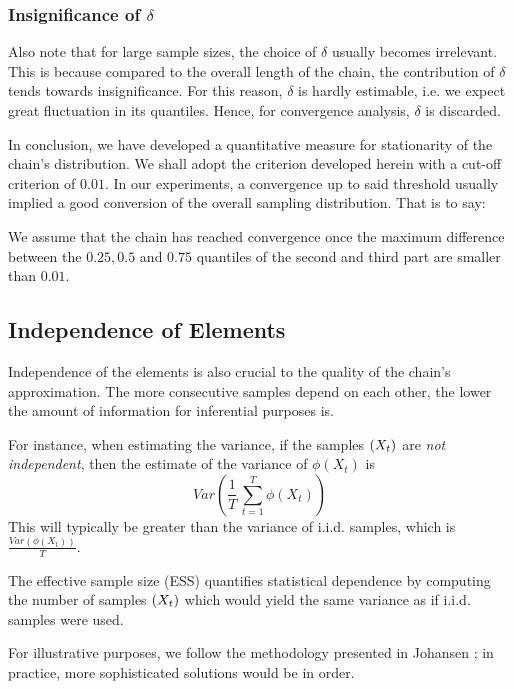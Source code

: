\subsubsection*{Insignificance of $\delta$}
Also note that for large sample sizes, the choice of $\delta$ usually becomes irrelevant. This is because compared to the overall length of the chain, the contribution of $\delta$ tends towards insignificance. For this reason, $\delta$ is hardly estimable, i.e. we expect great fluctuation in its quantiles. Hence, for convergence analysis, $\delta$ is discarded. 
\vspace{0.5cm}

In conclusion, we have developed a quantitative measure for stationarity of the chain's distribution. 
We shall adopt the criterion developed herein with a cut-off criterion of $0.01$. In our experiments, a convergence up to said threshold usually implied a good conversion of the overall sampling distribution.
 That is to say: 

\begin{center}
We assume that the chain has reached convergence once the maximum difference between the $0.25, 0.5$ and $0.75$ quantiles of the second and third part are smaller than $0.01$. 
\end{center}


\subsection{Independence of Elements}

Independence of the elements is also crucial to the quality of the chain's approximation. The more consecutive samples depend on each other, the lower the amount of information for inferential purposes is. 

For instance, when estimating the variance, if the samples $\left(X_t\right)$ are \textit{not independent}, then the estimate of the variance of $\phi(X_t)$ is 
\[
Var \left(	\frac{1}{T} \, \sum\limits_{t=1}^T \phi(X_t)\right)
\]
 This will typically be greater than the variance of i.i.d. samples, which is $\frac{Var\left(\phi(X_t) \right)}{T}$. 

The effective sample size (ESS) quantifies statistical dependence by computing the number of samples $\left(X_t\right)$ which would yield the same variance as if i.i.d. samples were used. 

For illustrative purposes, we follow the methodology presented in Johansen \cite{mcnotes}; in practice, more sophisticated solutions would be in order. 

